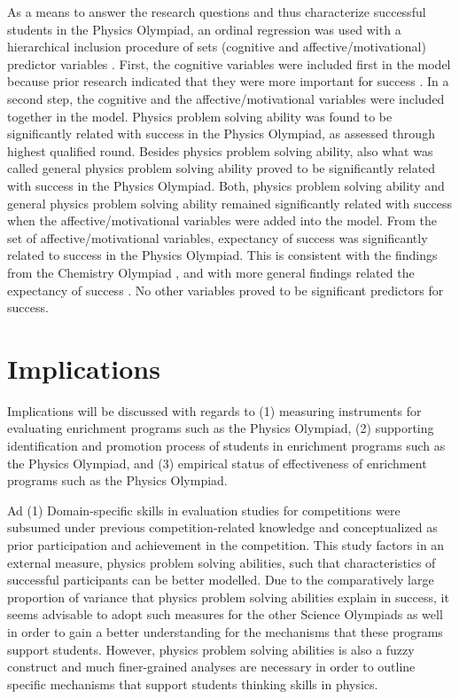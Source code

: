 \documentclass[]{interact}
\begin{document}
As a means to answer the research questions and thus characterize successful students in the Physics Olympiad, an ordinal regression was used with a hierarchical inclusion procedure of sets (cognitive and affective/motivational) predictor variables \citep{Field.2012}. First, the cognitive variables were included first in the model because prior research indicated that they were more important for success \citep[e.g.,][]{Urhahne.2012}. In a second step, the cognitive and the affective/motivational variables were included together in the model. Physics problem solving ability was found to be significantly related with success in the Physics Olympiad, as assessed through highest qualified round. Besides physics problem solving ability, also what was called general physics problem solving ability proved to be significantly related with success in the Physics Olympiad. Both, physics problem solving ability and general physics problem solving ability remained significantly related with success when the affective/motivational variables were added into the model. From the set of affective/motivational variables, expectancy of success was significantly related to success in the Physics Olympiad. This is consistent with the findings from the Chemistry Olympiad \citep{Urhahne.2012}, and with more general findings related the expectancy of success \citep{Eccles.1995}. No other variables proved to be significant predictors for success.



\section{Implications}

Implications will be discussed with regards to (1) measuring instruments for evaluating enrichment programs such as the Physics Olympiad, (2) supporting identification and promotion process of students in enrichment programs such as the Physics Olympiad, and (3) empirical status of effectiveness of enrichment programs such as the Physics Olympiad. 

Ad (1) Domain-specific skills in evaluation studies for competitions were subsumed under previous competition-related knowledge and conceptualized as prior participation and achievement in the competition. This study factors in an external measure, physics problem solving abilities, such that characteristics of successful participants can be better modelled. Due to the comparatively large proportion of variance that physics problem solving abilities explain in success, it seems advisable to adopt such measures for the other Science Olympiads as well in order to gain a better understanding for the mechanisms that these programs support students. However, physics problem solving abilities is also a fuzzy construct and much finer-grained analyses are necessary in order to outline specific mechanisms that support students thinking skills in physics.
\end{document}
